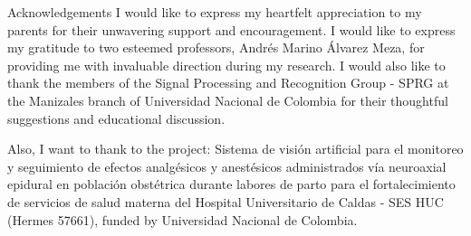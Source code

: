 \documentclass[aspectratio=169]{beamer}
\begin{document}
\begin{frame}{Acknowledgements}
    \centering
    I would like to express my heartfelt appreciation to my parents for their unwavering support and encouragement.
    \vspace{1em}
    I would like to express my gratitude to two esteemed professors, Andrés Marino Álvarez Meza, for providing me with invaluable direction during my research. I would also like to thank the members of the Signal Processing and Recognition Group - SPRG at the Manizales branch of Universidad Nacional de Colombia for their thoughtful suggestions and educational discussion.
    
    \vspace{1em}
    Also, I want to thank to the project: Sistema de visión artificial para el monitoreo y seguimiento de efectos analgésicos y anestésicos administrados vía neuroaxial epidural en población obstétrica durante labores de parto para el fortalecimiento de servicios de salud materna del Hospital Universitario de Caldas - SES HUC (Hermes 57661), funded by Universidad Nacional de Colombia.
\end{frame}

    

\end{document}
